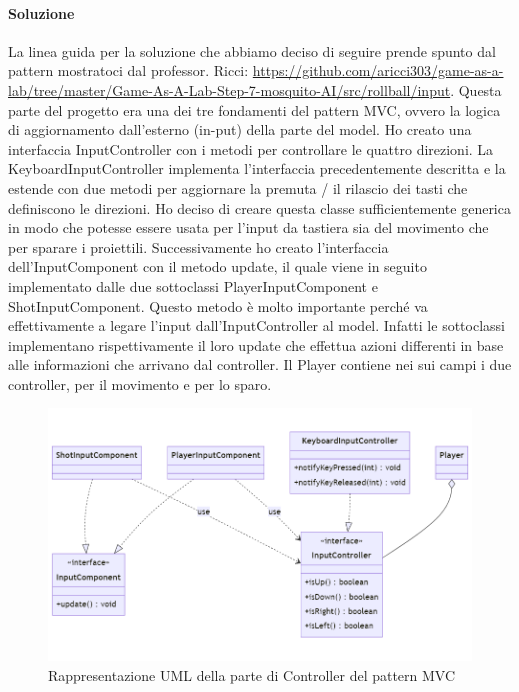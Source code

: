 \documentclass[a4paper,12pt]{report}
\begin{document}
\paragraph{Soluzione} La linea guida per la soluzione che abbiamo deciso di seguire prende spunto dal pattern mostratoci dal professor. Ricci: \url{https://github.com/aricci303/game-as-a-lab/tree/master/Game-As-A-Lab-Step-7-mosquito-AI/src/rollball/input}. Questa parte del progetto era una dei tre fondamenti del pattern MVC, ovvero la logica di aggiornamento dall'esterno (in-put) della parte del model. Ho creato una interfaccia InputController con i metodi per controllare le quattro direzioni. La KeyboardInputController implementa l'interfaccia precedentemente descritta e la estende con due metodi per aggiornare la premuta / il rilascio dei tasti che definiscono le direzioni. Ho deciso di creare questa classe sufficientemente generica in modo che potesse essere usata per l'input da tastiera sia del movimento che per sparare i proiettili. Successivamente ho creato l'interfaccia dell'InputComponent con il metodo update, il quale viene in seguito implementato dalle due sottoclassi PlayerInputComponent e ShotInputComponent. Questo metodo è molto importante perché va effettivamente a legare l'input dall'InputController al model. Infatti le sottoclassi implementano rispettivamente il loro update che effettua azioni differenti in base alle informazioni che arrivano dal controller. Il Player contiene nei sui campi i due controller, per il movimento e per lo sparo.
\begin{figure}[H]
    \centering{}
    \includegraphics[scale=0.4]{diagram/InputComponent.png}
    \caption{Rappresentazione UML della parte di Controller del pattern MVC}
    \label{img:InputComponent}
\end{figure}
\end{document}

